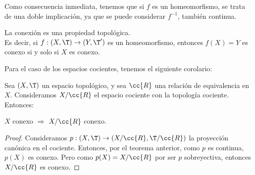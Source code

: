Como consecuencia inmediata, tenemos que si $f$ es un homeomorfismo, se trata de una doble implicación, ya que se puede considerar $f^{-1}$, también continua.
\begin{coro}
    La conexión es una propiedad topológica.\\Es decir, si $f:(X,\T)\to (Y,\T')$ es un homeomorfismo, entonces $f(X)=Y$ es conexo si y solo si $X$ es conexo.
\end{coro}

Para el caso de los espacios cocientes, tenemos el siguiente corolario:
\begin{prop}
    Sea $(X,\T)$ un espacio topológico, y sea $\cc{R}$ una relación de equivalencia en $X$. Consideramos $X/\cc{R}$ el espacio cociente con la topología cociente.
    Entonces:
    \begin{center}
        $X$ conexo $\Longrightarrow$ $X/\cc{R}$ conexo.
    \end{center}
\end{prop}
\begin{proof}
    Consideramos $p:(X,\T)\to (X/\cc{R}, \T/\cc{R})$ la proyección canónica en el cociente. Entonces, por el teorema anterior, como $p$ es continua, $p(X)$ es conexo. Pero como $p(X)=X/\cc{R}$ por ser $p$ sobreyectiva, entonces $X/\cc{R}$ es conexo.
\end{proof}

